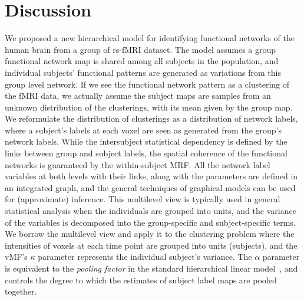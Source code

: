 \documentclass[review,authoryear]{elsarticle}
\begin{document}
\section{Discussion}
\label{sec:discussion}
We proposed a new hierarchical model for identifying functional networks of the
human brain from a group of rs-fMRI dataset. The model assumes a group
functional network map is shared among all subjects in the population, and
individual subjects' functional patterns are generated as variations from this
group level network. If we see the functional network pattern as a clustering of
the fMRI data, we actually assume the subject maps are samples from an unknown
distribution of the clusterings, with its mean given by the group map. We
reformulate the distribution of clusterings as a distribution of network labels,
where a subject's labels at each voxel are seen as generated from the group's
network labels. While the intersubject statistical dependency is defined by the
links between group and subject labels, the spatial coherence of the functional
networks is guaranteed by the within-subject MRF. All the network label
variables at both levels with their links, along with the parameters are defined
in an integrated graph, and the general techniques of graphical models can be
used for (approximate) inference. This multilevel view is typically used in
general statistical analysis when the individuals are grouped into units, and
the variance of the variables is decomposed into the group-specific and
subject-specific terms. We borrow the multilevel view and apply it to the
clustering problem where the intensities of voxels at each time point are
grouped into units (subjects), and the vMF's $\kappa$ parameter represents the
individual subject's variance. The $\alpha$ parameter is equivalent to the
\emph{pooling factor} in the standard hierarchical linear
model~\citep{gelman2006bayesian}, and controls the degree to which the estimates
of subject label maps are pooled together.
\end{document}
